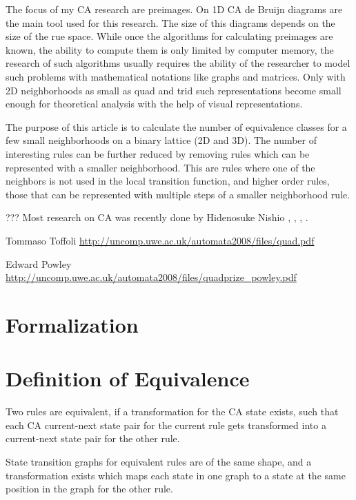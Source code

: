 \documentclass{ijuc}
\begin{document}
The focus of my CA research are preimages. On 1D CA de Bruijn diagrams are the main tool
used for this research. The size of this diagrams depends on the size of the rue space.
While once the algorithms for calculating preimages are known, the ability to compute
them is only limited by computer memory, the research of such algorithms usually requires
the ability of the researcher to model such problems with mathematical notations like
graphs and matrices. Only with 2D neighborhoods as small as quad and trid such representations
become small enough for theoretical analysis with the help of visual representations.

The purpose of this article is to calculate the number of equivalence classes for a few small
neighborhoods on a binary lattice (2D and 3D). The number of interesting rules can be further
reduced by removing rules which can be represented with a smaller neighborhood. This are rules
where one of the neighbors is not used in the local transition function, and higher order rules,
those that can be represented with multiple steps of a smaller neighborhood rule.

??? Most research on CA was recently done by Hidenosuke Nishio \cite{DBLP:journals/jca/Nishio12},
\cite{DBLP:journals/fuin/Nishio10}, \cite{DBLP:conf/ncma/Nishio09}, \cite{DBLP:conf/automata/NishioW08}.

Tommaso Toffoli
\url{http://uncomp.uwe.ac.uk/automata2008/files/quad.pdf}

Edward Powley
\url{http://uncomp.uwe.ac.uk/automata2008/files/quadprize_powley.pdf}


\section{Formalization}



\section{Definition of Equivalence}

Two rules are equivalent, if a transformation for the CA state exists, such that each CA
current-next state pair for the current rule gets transformed into a current-next state pair
for the other rule.

State transition graphs for equivalent rules are of the same shape, and a transformation exists
which maps each state in one graph to a state at the same position in the graph for the other rule.
\end{document}
